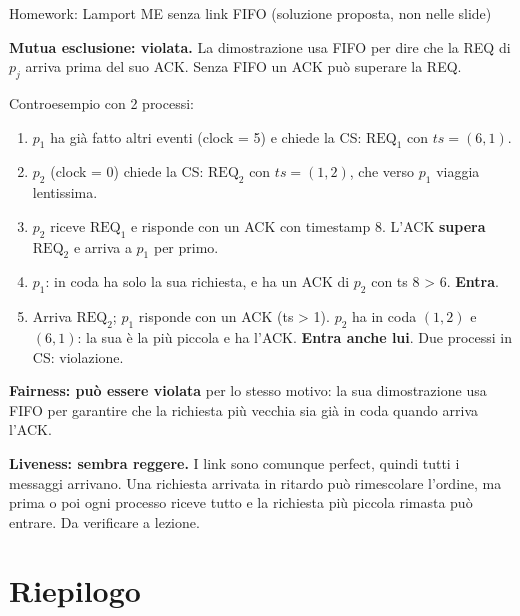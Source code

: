 \begin{approfondimento}{Homework: Lamport ME senza link FIFO (soluzione proposta, non nelle
slide)}

\textbf{Mutua esclusione: violata.} La dimostrazione usa FIFO per dire che la REQ di \(p_j\) arriva prima del suo ACK. Senza FIFO un ACK può superare la REQ.

Controesempio con 2 processi:

\begin{enumerate}
\def\labelenumi{\arabic{enumi}.}
\tightlist
\item
  \(p_1\) ha già fatto altri eventi (clock = 5) e chiede la CS: \(\text{REQ}_1\) con \(ts = (6, 1)\).
\item
  \(p_2\) (clock = 0) chiede la CS: \(\text{REQ}_2\) con \(ts = (1, 2)\), che verso \(p_1\) viaggia lentissima.
\item
  \(p_2\) riceve \(\text{REQ}_1\) e risponde con un ACK con timestamp 8. L'ACK \textbf{supera} \(\text{REQ}_2\) e arriva a \(p_1\) per primo.
\item
  \(p_1\): in coda ha solo la sua richiesta, e ha un ACK di \(p_2\) con ts 8 \textgreater{} 6. \textbf{Entra}.
\item
  Arriva \(\text{REQ}_2\); \(p_1\) risponde con un ACK (ts \textgreater{} 1). \(p_2\) ha in coda \((1,2)\) e \((6,1)\): la sua è la più piccola e ha l'ACK. \textbf{Entra anche lui}. Due processi in CS: violazione.
\end{enumerate}

\textbf{Fairness: può essere violata} per lo stesso motivo: la sua dimostrazione usa FIFO per garantire che la richiesta più vecchia sia già in coda quando arriva l'ACK.

\textbf{Liveness: sembra reggere.} I link sono comunque perfect, quindi tutti i messaggi arrivano. Una richiesta arrivata in ritardo può rimescolare l'ordine, ma prima o poi ogni processo riceve tutto e la richiesta più piccola rimasta può entrare. Da verificare a lezione.

\end{approfondimento}

\section{Riepilogo}

